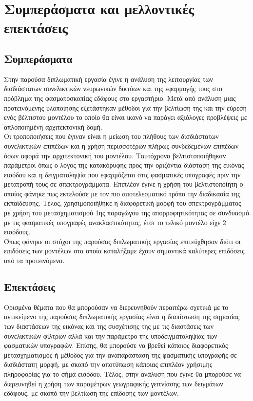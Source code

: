 \chapter{Συμπεράσματα και μελλοντικές επεκτάσεις}
\label{ch:conclusions}
\section{Συμπεράσματα}
Στην παρούσα διπλωματική εργασία έγινε η ανάλυση της λειτουργίας των δισδιάστατων συνελικτικών νευρωνικών δικτύων και της εφαρμογής τους στο πρόβλημα της φασματοσκοπίας εδάφους στο εργαστήριο. Μετά από ανάλυση μιας προτεινόμενης υλοποίησης εξετάστηκαν μέθοδοι για την βελτίωση της και την εύρεση ενός βέλτιστου μοντέλου το οποίο θα είναι ικανό να παράγει αξιόλογες προβλέψεις με απλοποιημένη αρχιτεκτονική δομή.\\
Οι τροποποιήσεις που έγιναν είναι η μείωση του πλήθους των δισδιάστατων συνελικτικών επιπέδων και η χρήση περισσοτέρων πλήρως συνδεδεμένων επιπέδων όσων αφορά την αρχιτεκτονική του μοντέλου. Ταυτόχρονα βελτιστοποιήθηκαν παράμετροι όπως ο λόγος της κατακόρυφης προς την οριζόντια διάσταση της εικόνας εισόδου και η δειγματοληψία που εφαρμόζεται στις φασματικές υπογραφές πριν την μετατροπή τους σε σπεκτρογράμματα. Επιπλέον έγινε η χρήση του βελτιστοποίητη  ο οποίος φάνηκε πως εκτελούσε με τον πιο αποτελεσματικό τρόπο την διαδικασία της εκπαίδευσης. Τέλος, χρησιμοποιήθηκε η διαφορετική μορφή του σπεκτρογράμματος με χρήση του μετασχηματισμού  1ης παραγώγου της απορροφητικότητας σε συνδυασμό με τις φασματικές υπογραφές ανακλαστικότητας, έτσι το τελικό μοντέλο είχε 2 εισόδους.\\
Όπως φάνηκε οι στόχοι της παρούσας διπλωματικής εργασίας επιτεύχθησαν διότι οι επιδόσεις των μοντέλων στα οποία καταλήξαμε έχουν σημαντικά καλύτερες επιδόσεις από τα προτεινόμενα.

\section{Επεκτάσεις}
Ορισμένα θέματα που θα μπορούσαν να διερευνηθούν περαιτέρω σχετικά με το αντικείμενο της παρούσας διπλωματικής εργασίας είναι η διαπίστωση της σημασίας των διαστάσεων της εικόνας και της συσχέτισης της με τις διαστάσεις των συνελικτικών φίλτρων αλλά και την παράμετρο της υποδειγματοληψίας των φασματικών υπογραφών. Επίσης, θα μπορούσε να βρεθεί κάποιος διαφορετικός μετασχηματισμός ή μέθοδος για την αναπαράσταση της φασματικής υπογραφής σε δισδιάστατη μορφή, με σκοπό την αποτύπωση κάποιας επιπλέον χρήσιμης πληροφορίας για το σήμα εισόδου. Τέλος, στην ανάλυση που έγινε θα μπορούσε να διερευνηθεί η χρήση των παραμέτρων γεωγραφικής γειτνίασης των δειγμάτων εδάφους, με σκοπό την βελτίωση της επίδοσης των μοντέλων.